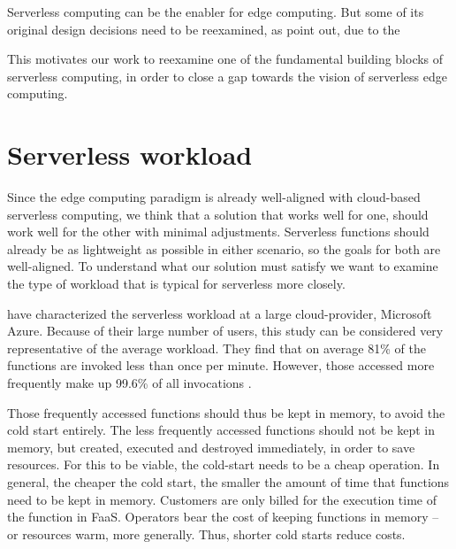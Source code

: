 Serverless computing can be the enabler for edge computing. But some of its original design decisions need to be reexamined, as \citeauthor{Nastic2018} point out, due to the

\begin{quote}
\end{quote}

This motivates our work to reexamine one of the fundamental building blocks of serverless computing, in order to close a gap towards the vision of serverless edge computing.

\section{Serverless workload}
\label{section:serverless_workload}

Since the edge computing paradigm is already well-aligned with cloud-based serverless computing, we think that a solution that works well for one, should work well for the other with minimal adjustments. Serverless functions should already be as lightweight as possible in either scenario, so the goals for both are well-aligned.
To understand what our solution must satisfy we want to examine the type of workload that is typical for serverless more closely.

\citeauthor{Shahrad2020} have characterized the serverless workload at a large cloud-provider, Microsoft Azure. Because of their large number of users, this study can be considered very representative of the average workload.
They find that on average 81\% of the functions are invoked less than once per minute. However, those accessed more frequently make up 99.6\% of all invocations \cite{Shahrad2020}.

Those frequently accessed functions should thus be kept in memory, to avoid the cold start entirely. The less frequently accessed functions should not be kept in memory, but created, executed and destroyed immediately, in order to save resources. For this to be viable, the cold-start needs to be a cheap operation. In general, the cheaper the cold start, the smaller the amount of time that functions need to be kept in memory.
Customers are only billed for the execution time of the function in FaaS. Operators bear the cost of keeping functions in memory -- or resources warm, more generally. Thus, shorter cold starts reduce costs.


